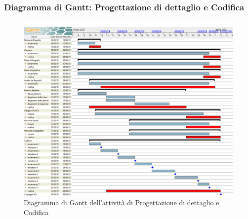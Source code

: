 \subsubsection{Diagramma di Gantt: Progettazione di dettaglio e Codifica}

\begin{landscape}

\begin{figure}[h]
 	\centering
	\includegraphics[width=\linewidth]{Images/GanttPianificazioneProgettazioneDettaglioCodifica.png}
	\caption{Diagramma di Gantt dell'attività di Progettazione di dettaglio e Codifica}
\end{figure}

\end{landscape}